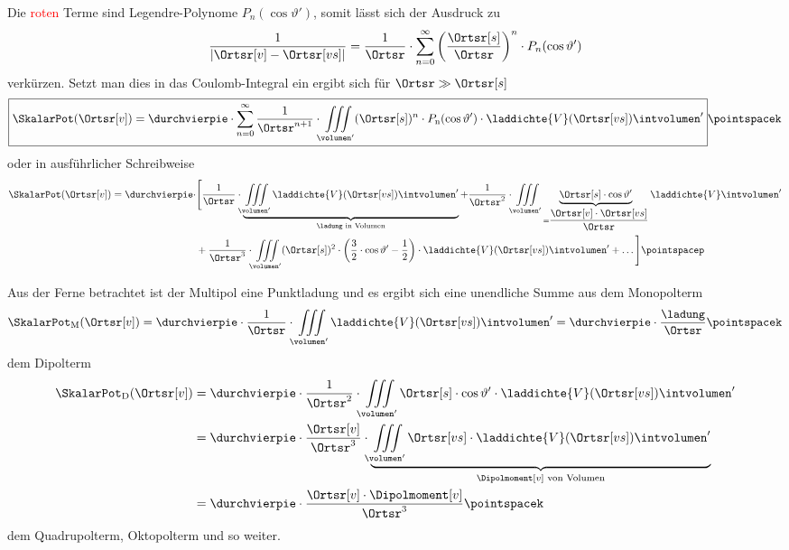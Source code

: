 \begin{frame}
Die \textcolor{red}{roten} Terme sind \alert{Legendre-Polynome} \(P_{n}(\cos \vartheta')\), somit lässt sich der Ausdruck zu
\begin{equation*}
	\dfrac{1}{\left| \Ortsr[v] - \Ortsr[vs] \right|}
		= \dfrac{1}{\Ortsr} \cdot \sum\limits_{n=0}^{\infty} \left( \dfrac{\Ortsr[s]}{\Ortsr} \right)^n \cdot P_n(\cos \vartheta')
\end{equation*}
verkürzen. Setzt man dies in das Coulomb-Integral ein ergibt sich für \(\Ortsr \gg \Ortsr[s] \)
\begin{equation*}
	\boxed{\SkalarPot(\Ortsr[v]) = \durchvierpie \cdot \sum\limits_{n = 0}^{\infty} \dfrac{1}{\Ortsr^{n+1}} \cdot \iiint\limits_{\volumen'} (\Ortsr[s])^n \cdot P_\mathrm{n}(\cos \vartheta') \cdot \laddichte{V}(\Ortsr[vs]) \intvolumen'} \pointspacek
\end{equation*}
oder in ausführlicher Schreibweise
\begin{equation*}
	\begin{split}
		\SkalarPot(\Ortsr[v]) = \durchvierpie \cdot	&\Biggl[ \dfrac{1}{\Ortsr} \cdot
		\underbrace{\iiint\limits_{\volumen'} \laddichte{V}(\Ortsr[vs]) \intvolumen'}_{\ladung \text{ in Volumen}}
		+ \dfrac{1}{\Ortsr^2} \cdot \iiint\limits_{\volumen'} \underbrace{\Ortsr[s] \cdot \cos \vartheta'}_{=\dfrac{\Ortsr[v] \cdot \Ortsr[vs]}{\Ortsr}} \laddichte{V} \intvolumen' \\
		&+ \dfrac{1}{\Ortsr^3} \cdot \iiint\limits_{\volumen'} (\Ortsr[s])^2 \cdot \left( \dfrac{3}{2} \cdot \cos \vartheta' - \dfrac{1}{2} \right) \cdot \laddichte{V}(\Ortsr[vs]) \intvolumen' + \dots \Biggr] \pointspacep
	\end{split}
\end{equation*}
\end{frame}
\begin{frame}
Aus der Ferne betrachtet ist der Multipol eine Punktladung und es ergibt sich eine unendliche Summe aus dem Monopolterm
\begin{equation*}
	\SkalarPot_\mathrm{M}(\Ortsr[v])
		= \durchvierpie \cdot \dfrac{1}{\Ortsr} \cdot \iiint\limits_{\volumen'} \laddichte{V}(\Ortsr[vs]) \intvolumen'
		= \durchvierpie \cdot \dfrac{\ladung}{\Ortsr} \pointspacek
\end{equation*}
dem Dipolterm
\begin{align*}
	\SkalarPot_\mathrm{D}(\Ortsr[v])
		&= \durchvierpie \cdot \dfrac{1}{\Ortsr^2} \cdot \iiint\limits_{\volumen'} \Ortsr[s] \cdot \cos \vartheta' \cdot \laddichte{V}(\Ortsr[vs]) \intvolumen'\\
		&= \durchvierpie \cdot \dfrac{\Ortsr[v]}{\Ortsr^3} \cdot
			\underbrace{\iiint\limits_{\volumen'} \Ortsr[vs] \cdot \laddichte{V}(\Ortsr[vs]) \intvolumen'}_{\Dipolmoment[v] \text{ von Volumen}}\\
		&= \durchvierpie \cdot \dfrac{\Ortsr[v] \cdot \Dipolmoment[v]}{\Ortsr^3} \pointspacek
\end{align*}
dem Quadrupolterm, Oktopolterm und so weiter.

\end{frame}

